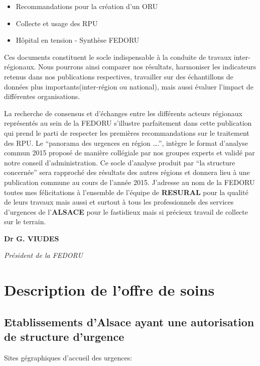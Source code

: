 \documentclass[]{article}
\begin{document}
\begin{itemize}
\itemsep1pt\parskip0pt
\item
  Recommandations pour la création d'un ORU
\item
  Collecte et usage des RPU
\item
  Hôpital en tension - Synthèse FEDORU
\end{itemize}

Ces documents constituent le socle indispensable à la conduite de
travaux inter-régionaux. Nous pourrons ainsi comparer nos résultats,
harmoniser les indicateurs retenus dans nos publications respectives,
travailler sur des échantillons de données plus importants(inter-région
ou national), mais aussi évaluer l'impact de différentes organisations.

La recherche de consensus et d'échanges entre les différents acteurs
régionaux représentés au sein de la FEDORU s'illustre parfaitement dans
cette publication qui prend le parti de respecter les premières
recommandations sur le traitement des RPU. Le ``panorama des urgences en
région \ldots{}.'', intègre le format d'analyse commun 2015 proposé de
manière collégiale par nos groupes experts et validé par notre conseil
d'administration. Ce socle d'analyse produit par ``la structure
concernée'' sera rapproché des résultats des autres régions et donnera
lieu à une publication commune au cours de l'année 2015. J'adresse au
nom de la FEDORU toutes mes félicitations à l'ensemble de l'équipe de
\textbf{RESURAL} pour la qualité de leurs travaux mais aussi et surtout
à tous les professionnels des services d'urgences de l'\textbf{ALSACE}
pour le fastidieux mais si précieux travail de collecte sur le terrain.

\textbf{Dr G. VIUDES}

\emph{Président de la FEDORU}

\section{Description de l'offre de
soins}\label{description-de-loffre-de-soins}

\subsection{Etablissements d'Alsace ayant une autorisation de structure
d'urgence}\label{etablissements-dalsace-ayant-une-autorisation-de-structure-durgence}

Sites gégraphiques d'accueil des urgences:
\end{document}
